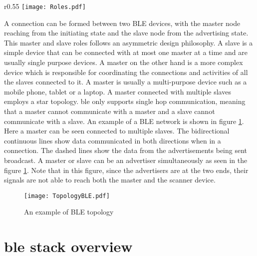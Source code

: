 \begin{wrapfigure}{r}{0.55\textwidth}
\centering
\texttt{[image: Roles.pdf]}
\caption{State diagram of BLE states}
\label{fig:Roles}
\vspace{-10pt}
\end{wrapfigure}

A connection can be formed between two BLE devices, with the master node reaching from the initiating state and the slave node from the advertising state. This master and slave roles follows an asymmetric design philosophy. A slave is a simple device that can be connected with at most one master at a time and are usually single purpose devices. A master on the other hand is a more complex device which is responsible for coordinating the connections and activities of all the slaves connected to it. A master is usually a multi-purpose device such as a mobile phone, tablet or a laptop. A master connected with multiple slaves employs a star topology. \gls{ble} only supports single hop communication, meaning that a master cannot communicate with a master and a slave cannot communicate with a slave. An example of a BLE network is shown in figure \ref{fig:TopoBLE}. Here a master can be seen connected to multiple slaves. The bidirectional continuous lines show data communicated in both directions when in a connection. The dashed lines show the data from the advertisements being sent broadcast. A master or slave can be an advertiser simultaneously as seen in the figure \ref{fig:TopoBLE}. Note that in this figure, since the advertisers are at the two ends, their signals are not able to reach both the master and the scanner device.

\begin{figure}[h]
\centering
\texttt{[image: TopologyBLE.pdf]}
\caption{An example of BLE topology}
\label{fig:TopoBLE}
\vspace{-10pt}
\end{figure}


\section[\texorpdfstring{\gls{ble}}{BLE} Stack Overview]{\texorpdfstring{\gls{ble}}{BLE} stack overview\cite{Heydon2012}}

